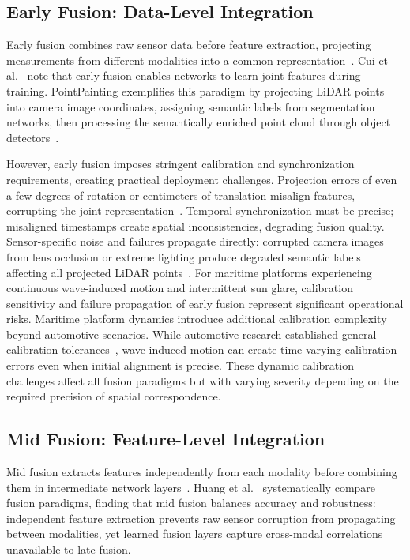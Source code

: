 \documentclass[../main.tex]{subfiles}
\begin{document}
\subsection{Early Fusion: Data-Level Integration}

Early fusion combines raw sensor data before feature extraction, projecting measurements from different modalities into a common representation~\cite{cui2022}.
Cui et al.~\cite{cui2022} note that early fusion enables networks to learn joint features during training.
PointPainting exemplifies this paradigm by projecting \ac{LiDAR} points into camera image coordinates, assigning semantic labels from segmentation networks, then processing the semantically enriched point cloud through object detectors~\cite{cui2022}.

However, early fusion imposes stringent calibration and synchronization requirements, creating practical deployment challenges.
Projection errors of even a few degrees of rotation or centimeters of translation misalign features, corrupting the joint representation~\cite{cui2022}.
Temporal synchronization must be precise; misaligned timestamps create spatial inconsistencies, degrading fusion quality.
Sensor-specific noise and failures propagate directly: corrupted camera images from lens occlusion or extreme lighting produce degraded semantic labels affecting all projected \ac{LiDAR} points~\cite{cui2022}.
For maritime platforms experiencing continuous wave-induced motion and intermittent sun glare, calibration sensitivity and failure propagation of early fusion represent significant operational risks.
Maritime platform dynamics introduce additional calibration complexity beyond automotive scenarios.
While automotive research established general calibration tolerances~\cite{cui2022}, wave-induced motion can create time-varying calibration errors even when initial alignment is precise.
These dynamic calibration challenges affect all fusion paradigms but with varying severity depending on the required precision of spatial correspondence.

\subsection{Mid Fusion: Feature-Level Integration}

Mid fusion extracts features independently from each modality before combining them in intermediate network layers~\cite{huang2024}.
Huang et al.~\cite{huang2024} systematically compare fusion paradigms, finding that mid fusion balances accuracy and robustness: independent feature extraction prevents raw sensor corruption from propagating between modalities, yet learned fusion layers capture cross-modal correlations unavailable to late fusion.
\end{document}
